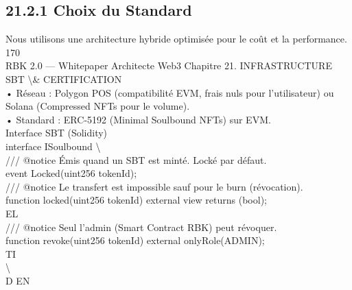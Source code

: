 \subsection{21.2.1 Choix du Standard}
Nous utilisons une architecture hybride optimisée pour le coût et la performance.\\
\vspace{0.5em}
\vspace{0.5em}
\vspace{0.5em}
170\\
RBK 2.0 — Whitepaper Architecte Web3                                                   Chapitre 21. INFRASTRUCTURE SBT \textbackslash{}& CERTIFICATION\\
\vspace{0.5em}
\vspace{0.5em}
• Réseau : Polygon POS (compatibilité EVM, frais nuls pour l’utilisateur) ou Solana (Compressed NFTs pour le volume).\\
\vspace{0.5em}
• Standard : ERC-5192 (Minimal Soulbound NFTs) sur EVM.\\
\vspace{0.5em}
Interface SBT (Solidity)\\
\vspace{0.5em}
\vspace{0.5em}
interface ISoulbound \textbackslash{}{\\
/// @notice Émis quand un SBT est minté. Locké par défaut.\\
event Locked(uint256 tokenId);\\
/// @notice Le transfert est impossible sauf pour le burn (révocation).\\
function locked(uint256 tokenId) external view returns (bool);\\
\vspace{0.5em}
\vspace{0.5em}
\vspace{0.5em}
\vspace{0.5em}
EL\\
/// @notice Seul l'admin (Smart Contract RBK) peut révoquer.\\
function revoke(uint256 tokenId) external onlyRole(ADMIN);\\
\vspace{0.5em}
\vspace{0.5em}
\vspace{0.5em}
\vspace{0.5em}
TI\\
\textbackslash{}}\\
\vspace{0.5em}
\vspace{0.5em}
\vspace{0.5em}
\vspace{0.5em}
D      EN\\
